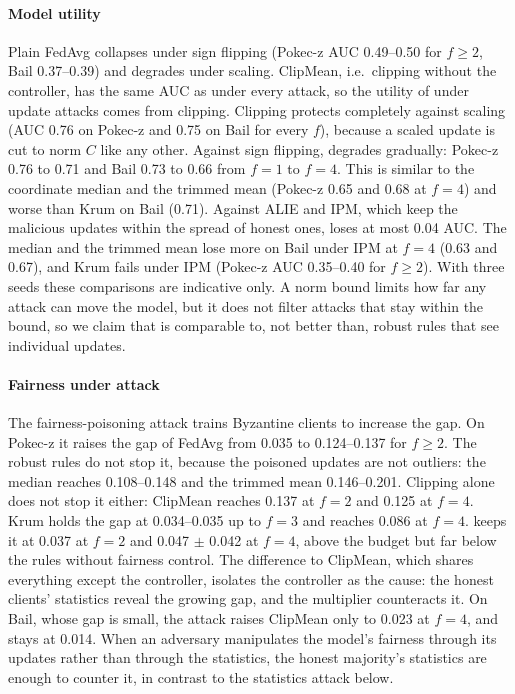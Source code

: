 \paragraph{Model utility}
Plain FedAvg collapses under sign flipping (Pokec-z AUC 0.49--0.50 for $f\ge2$, Bail 0.37--0.39) and degrades under scaling. ClipMean, i.e.\ clipping without the controller, has the same AUC as \clamp{} under every attack, so the utility of \clamp{} under update attacks comes from clipping. Clipping protects completely against scaling (AUC 0.76 on Pokec-z and 0.75 on Bail for every $f$), because a scaled update is cut to norm $C$ like any other. Against sign flipping, \clamp{} degrades gradually: Pokec-z 0.76 to 0.71 and Bail 0.73 to 0.66 from $f=1$ to $f=4$. This is similar to the coordinate median and the trimmed mean (Pokec-z 0.65 and 0.68 at $f=4$) and worse than Krum on Bail (0.71). Against ALIE and IPM, which keep the malicious updates within the spread of honest ones, \clamp{} loses at most 0.04 AUC. The median and the trimmed mean lose more on Bail under IPM at $f=4$ (0.63 and 0.67), and Krum fails under IPM (Pokec-z AUC 0.35--0.40 for $f\ge2$). With three seeds these comparisons are indicative only. A norm bound limits how far any attack can move the model, but it does not filter attacks that stay within the bound, so we claim that \clamp{} is comparable to, not better than, robust rules that see individual updates.

\paragraph{Fairness under attack}
The fairness-poisoning attack trains Byzantine clients to increase the gap. On Pokec-z it raises the gap of FedAvg from 0.035 to 0.124--0.137 for $f\ge2$. The robust rules do not stop it, because the poisoned updates are not outliers: the median reaches 0.108--0.148 and the trimmed mean 0.146--0.201. Clipping alone does not stop it either: ClipMean reaches 0.137 at $f=2$ and 0.125 at $f=4$. Krum holds the gap at 0.034--0.035 up to $f=3$ and reaches 0.086 at $f=4$. \clamp{} keeps it at 0.037 at $f=2$ and 0.047 $\pm$ 0.042 at $f=4$, above the budget but far below the rules without fairness control. The difference to ClipMean, which shares everything except the controller, isolates the controller as the cause: the honest clients' statistics reveal the growing gap, and the multiplier counteracts it. On Bail, whose gap is small, the attack raises ClipMean only to 0.023 at $f=4$, and \clamp{} stays at 0.014. When an adversary manipulates the model's fairness through its updates rather than through the statistics, the honest majority's statistics are enough to counter it, in contrast to the statistics attack below.

